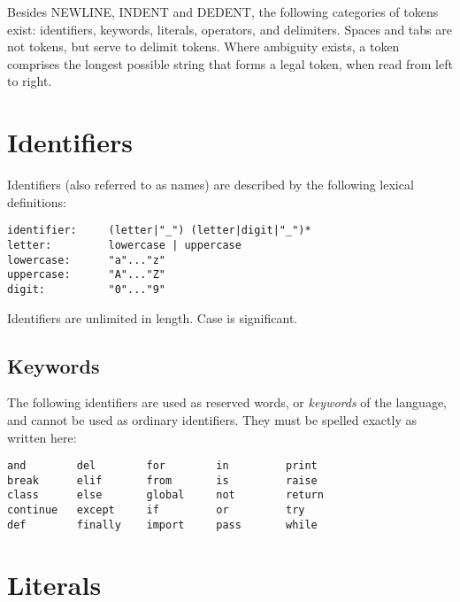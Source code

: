 Besides NEWLINE, INDENT and DEDENT, the following categories of tokens
exist: identifiers, keywords, literals, operators, and delimiters.
Spaces and tabs are not tokens, but serve to delimit tokens.  Where
ambiguity exists, a token comprises the longest possible string that
forms a legal token, when read from left to right.

\section{Identifiers}

Identifiers (also referred to as names) are described by the following
lexical definitions:

\begin{verbatim}
identifier:     (letter|"_") (letter|digit|"_")*
letter:         lowercase | uppercase
lowercase:      "a"..."z"
uppercase:      "A"..."Z"
digit:          "0"..."9"
\end{verbatim}

Identifiers are unlimited in length.  Case is significant.

\subsection{Keywords}

The following identifiers are used as reserved words, or {\em
keywords} of the language, and cannot be used as ordinary
identifiers.  They must be spelled exactly as written here:

\begin{verbatim}
and        del        for        in         print
break      elif       from       is         raise
class      else       global     not        return
continue   except     if         or         try
def        finally    import     pass       while
\end{verbatim}


\section{Literals} \label{literals}

